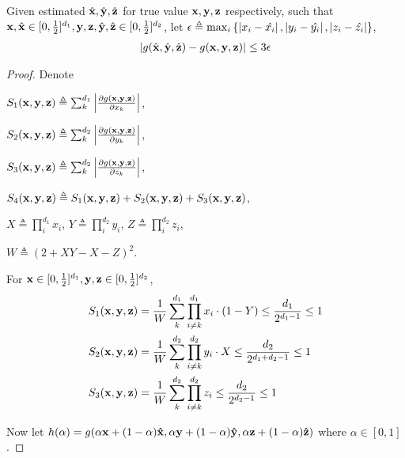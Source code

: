 	\begin{lemma}
		\label{meanvalue2}
		Given estimated $\hat{\bf x},\hat{\bf y},\hat{\bf z}$ for true value $ {\bf x}, {\bf y}, {\bf z}$ respectively, such that ${\bf x}, \hat{\bf x} \in [0, \frac{1}{2}]^{d_1} , {\bf y,z}, \hat{\bf y},\hat{\bf z} \in [0, \frac{1}{2}]^{d_2}$,
		let $\epsilon \triangleq \max_i \left\{\left\vert x_i - \hat{x_i}\right\vert, \left\vert y_i - \hat{y_i} \right\vert , \left\vert z_i - \hat{z_i}\right\vert\right\}$,
		\begin{align*}
		\left\vert g(\hat{\bf x}, \hat{\bf y}, \hat{\bf z}) - g({\bf x,y,z})\right\vert
		\leq  3\epsilon
		\end{align*}

	\end{lemma}

	\begin{proof}
Denote

$S_1({\bf x,y,z}) \triangleq \sum_k^{d_1} \left\vert \frac{\partial g({\bf x,y,z})}{\partial x_k} \right\vert$,

$S_2({\bf x,y,z}) \triangleq \sum_k^{d_2} \left\vert \frac{\partial g({\bf x,y,z})}{\partial y_k} \right\vert$,

$S_3({\bf x,y,z}) \triangleq \sum_k^{d_2} \left\vert \frac{\partial g({\bf x,y,z})}{\partial z_k} \right\vert$,

$S_4({\bf x,y,z}) \triangleq S_1({\bf x,y,z})+S_2({\bf x,y,z})+S_3({\bf x,y,z})$,

$X \triangleq \prod_i^{d_1} x_i$,
$Y \triangleq \prod_i^{d_2} y_i$,
$Z \triangleq \prod_i^{d_2} z_i$,

$W \triangleq (2+X Y-X-Z)^2$.

For ${\bf x} \in [0, \frac{1}{2}]^{d_1} , {\bf y,z} \in [0, \frac{1}{2}]^{d_2}$,
		\begin{align*}
		S_1({\bf x,y,z}) &= \frac{1}{W} \sum_k^{d_1} \prod_{i\neq k}^{d_1} x_i \cdot \left( 1 - Y \right)
		\leq \frac{d_1}{2^{d_1 - 1}}  \leq 1 \\
		S_2({\bf x,y,z}) &= \frac{1}{W} \sum_k^{d_2} \prod_{i\neq k}^{d_2} y_i \cdot X
		\leq  \frac{d_2}{2^{d_1 + d_2 - 1}} \leq 1 \\
		S_3({\bf x,y,z}) &= \frac{1}{W} \sum_k^{d_2} \prod_{i\neq k}^{d_2} z_i
		\leq \frac{d_2}{2^{d_2 - 1}} \leq 1
		\end{align*}

        Now let $h(\alpha) = g(\alpha {\bf x} + (1 - \alpha) {\bf \hat{x}}, \alpha {\bf y} + (1 - \alpha) {\bf \hat{y}}, \alpha {\bf z} + (1 - \alpha) {\bf \hat{z}})$ where $\alpha \in [0,1]$.


\end{proof}

